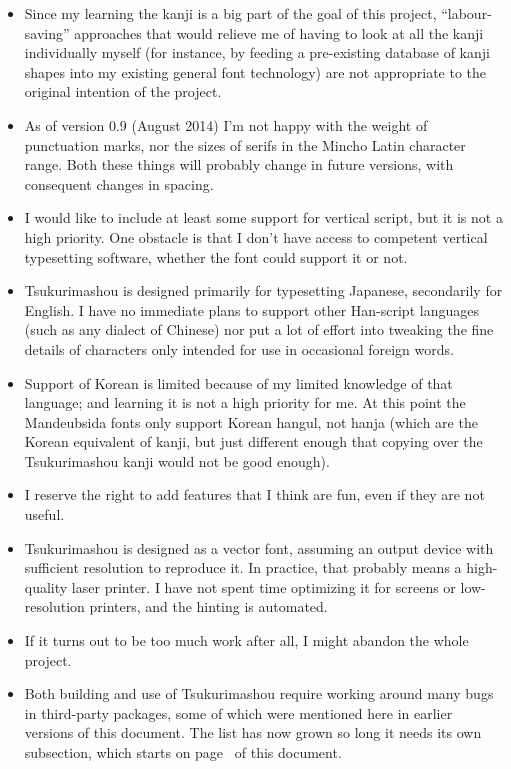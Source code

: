 \documentclass[14pt]{extarticle}
\begin{document}
\begin{itemize}
  \item Since my learning the kanji is a big part of the goal of this
  project, ``labour-saving'' approaches that would relieve me of having to
  look at all the kanji individually myself (for instance, by feeding a
  pre-existing database of kanji shapes into my existing general font
  technology) are not appropriate to the original intention of the project. 

  \item As of version 0.9 (August 2014) I'm not happy with the weight of
  punctuation marks, nor the sizes of serifs in the Mincho Latin character
  range.  Both these things will probably change in future versions, with
  consequent changes in spacing.

  \item I would like to include at least some support for vertical script,
  but it is not a high priority.  One obstacle is that I don't have access
  to competent vertical typesetting software, whether the font could support
  it or not.

  \item Tsukurimashou is designed primarily for typesetting Japanese,
  secondarily for English.  I have no immediate plans to support
  other Han-script languages (such as any dialect of Chinese) nor put a
  lot of effort into tweaking the fine details of characters only intended
  for use in occasional foreign words.

  \item Support of Korean is limited because of my limited knowledge
  of that language; and learning it is not a high priority for me.  At
  this point the Mandeubsida fonts only support Korean hangul, not hanja
  (which are the Korean equivalent of kanji, but just different enough
  that copying over the Tsukurimashou kanji would not be good enough).

  \item I reserve the right to add features that I think are fun, even if
  they are not useful.

  \item Tsukurimashou is designed as a vector font, assuming an output
  device with sufficient resolution to reproduce it.  In practice, that
  probably means a high-quality laser printer.  I have not spent time
  optimizing it for screens or low-resolution printers, and the hinting is
  automated.

  \item If it turns out to be too much work after all, I might abandon the
  whole project.

  \item Both building and use of Tsukurimashou require working around many
  bugs in third-party packages, some of which were mentioned here in earlier
  versions of this document.  The list has now grown so long it needs its
  own subsection, which starts on page~\pageref{sub:bugs} of this document.
\end{itemize}
\end{document}
